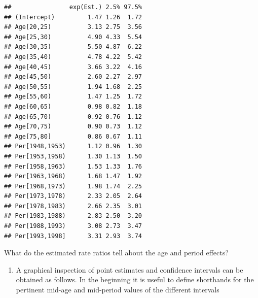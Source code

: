 \documentclass[
]{book}
\providecommand{\tightlist}{%
  \setlength{\itemsep}{0pt}\setlength{\parskip}{0pt}}
\begin{document}
\begin{verbatim}
##                exp(Est.) 2.5% 97.5%
## (Intercept)         1.47 1.26  1.72
## Age[20,25)          3.13 2.75  3.56
## Age[25,30)          4.90 4.33  5.54
## Age[30,35)          5.50 4.87  6.22
## Age[35,40)          4.78 4.22  5.42
## Age[40,45)          3.66 3.22  4.16
## Age[45,50)          2.60 2.27  2.97
## Age[50,55)          1.94 1.68  2.25
## Age[55,60)          1.47 1.25  1.72
## Age[60,65)          0.98 0.82  1.18
## Age[65,70)          0.92 0.76  1.12
## Age[70,75)          0.90 0.73  1.12
## Age[75,80]          0.86 0.67  1.11
## Per[1948,1953)      1.12 0.96  1.30
## Per[1953,1958)      1.30 1.13  1.50
## Per[1958,1963)      1.53 1.33  1.76
## Per[1963,1968)      1.68 1.47  1.92
## Per[1968,1973)      1.98 1.74  2.25
## Per[1973,1978)      2.33 2.05  2.64
## Per[1978,1983)      2.66 2.35  3.01
## Per[1983,1988)      2.83 2.50  3.20
## Per[1988,1993)      3.08 2.73  3.47
## Per[1993,1998]      3.31 2.93  3.74
\end{verbatim}

What do the estimated rate ratios tell about the age and period effects?

\begin{enumerate}
\def\labelenumi{\arabic{enumi}.}
\setcounter{enumi}{1}
\tightlist
\item
  A graphical inspection of point estimates and confidence
  intervals can be obtained as follows. In the beginning it is useful
  to define shorthands for the pertinent mid-age and mid-period values
  of the different intervals
\end{enumerate}
\end{document}
